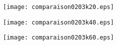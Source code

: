  \begin{figure}[ht]
\begin{center}
     \texttt{[image: comparaison0203k20.eps]}
\end{center}
\caption{}

\end{figure}


 \begin{figure}[ht]
\begin{center}
     \texttt{[image: comparaison0203k40.eps]}
\end{center}
\caption{}

\end{figure}

 \begin{figure}[ht]
\begin{center}
     \texttt{[image: comparaison0203k60.eps]}
\end{center}
\caption{}

\end{figure}

